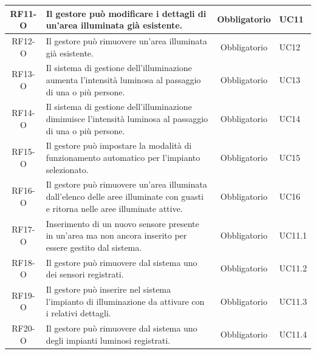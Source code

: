 \documentclass[a4paper, 12pt]{article}
\begin{document}
\begin{longtable}{|c|p{7cm}|c|p{4cm}|}
    \hline
    RF11-O & Il gestore può modificare i dettagli di un'area illuminata già esistente. & Obbligatorio & UC11 \\
    \hline
    RF12-O & Il gestore può rimuovere un'area illuminata già esistente. & Obbligatorio & UC12 \\
    \hline
    RF13-O & Il sistema di gestione dell'illuminazione aumenta l'intensità luminosa al passaggio di una o più persone. & Obbligatorio & UC13 \\
    \hline
    RF14-O & Il sistema di gestione dell'illuminazione diminuisce l'intensità luminosa al passaggio di una o più persone. & Obbligatorio & UC14 \\
    \hline
    RF15-O & Il gestore può impostare la modalità di funzionamento automatico per l'impianto selezionato. & Obbligatorio & UC15 \\
    \hline
    RF16-O & Il gestore può rimuovere un'area illuminata dall'elenco delle aree illuminate con guasti e ritorna nelle aree illuminate attive. & Obbligatorio & UC16 \\
    \hline
    RF17-O & Inserimento di un nuovo sensore presente in un'area ma non ancora inserito per essere gestito dal sistema. & Obbligatorio & UC11.1 \\
    \hline
    RF18-O & Il gestore può rimuovere dal sistema uno dei sensori registrati. & Obbligatorio & UC11.2\\
    \hline
    RF19-O & Il gestore può inserire nel sistema l'impianto di illuminazione da attivare con i relativi dettagli. & Obbligatorio & UC11.3\\
    \hline
    RF20-O & Il gestore può rimuovere dal sistema uno degli impianti luminosi registrati. & Obbligatorio & UC11.4 \\
    \bottomrule
\end{longtable}
\end{document}
